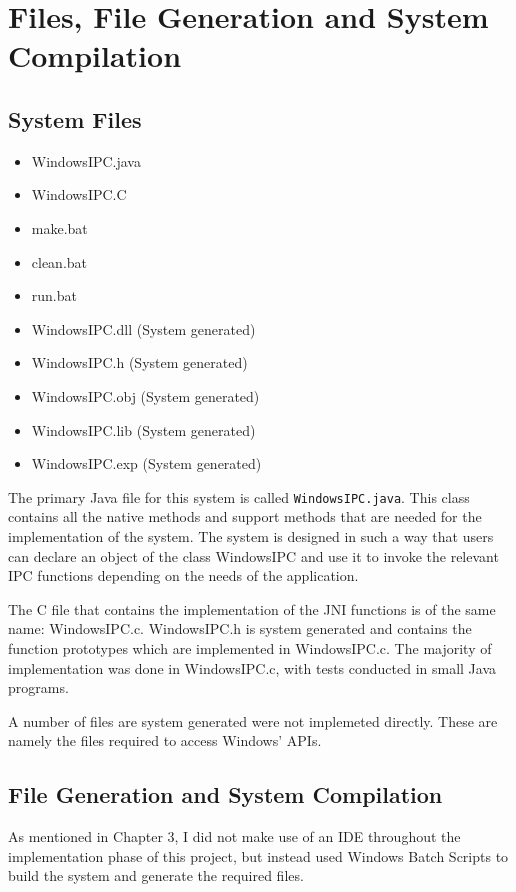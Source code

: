 \documentclass[12pt] {newrucsthesis}    %
\def\code#1{\texttt{#1}}
\begin{document}
    \section{Files, File Generation and System Compilation} \label{syscomp}
      \subsection{System Files}
        \begin{itemize}
          \item WindowsIPC.java
          \item WindowsIPC.C
          \item make.bat
          \item clean.bat
          \item run.bat
          \item WindowsIPC.dll (System generated)
          \item WindowsIPC.h (System generated)
          \item WindowsIPC.obj (System generated)
          \item WindowsIPC.lib (System generated)
          \item WindowsIPC.exp (System generated)
        \end{itemize}

        The primary Java file for this system is called \code{WindowsIPC.java}.
        This class contains all the native methods and support methods that are needed for the implementation
        of the system. The system is designed in such a way that users can declare an object of the class
        WindowsIPC and use it to invoke the relevant IPC functions depending on the needs of the application.

        The C file that contains the implementation of the JNI functions is of the same name:
        WindowsIPC.c. WindowsIPC.h is system generated and contains the function prototypes which are implemented in
        WindowsIPC.c. The majority of implementation was done in WindowsIPC.c, with tests conducted in small Java
        programs.

        A number of files are system generated were not implemeted directly. These are namely the files required
        to access Windows' APIs.

      \subsection{File Generation and System Compilation}
        As mentioned in Chapter 3, I did not make use of an IDE throughout the implementation phase of this
        project, but instead used Windows Batch Scripts to build the system and generate the required files.
\end{document}
